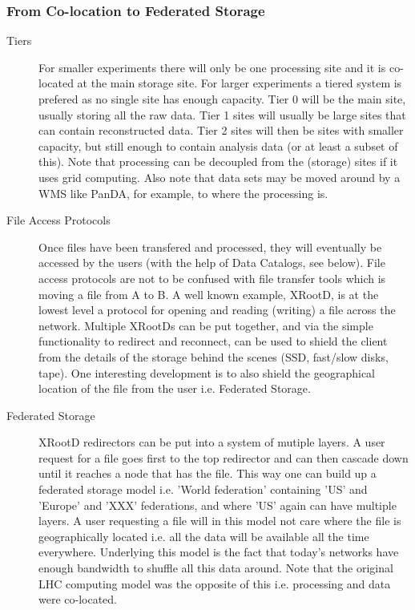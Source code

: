 \subsubsection{From Co-location to Federated Storage}

\begin{description}
\item[Tiers] For smaller experiments there will only be one processing site and it is co-located at the main storage site. For larger experiments 
a tiered system is prefered as no single site has enough capacity. Tier 0 will be the main site, usually storing all the raw data. Tier 1 sites will 
usually be large sites that can contain reconstructed data. Tier 2 sites will then be sites with smaller capacity, but still enough to contain 
analysis data (or at least a subset of this). Note that processing can be decoupled from the (storage) sites if it uses grid computing. Also note 
that data sets may be moved around by a WMS like PanDA, for example, to where the processing is.  

\item[File Access Protocols] Once files have been transfered and processed, they will eventually be accessed by the users (with the help of 
Data Catalogs, see below). File access protocols are not to be confused with file transfer tools which is moving a file from A to B. 
A well known example, XRootD, is at the lowest level a protocol for opening and reading (writing) a file across the network. Multiple XRootDs can 
be put together, and via the simple functionality to redirect and reconnect, can be used to shield the client from the details of the storage 
behind the scenes (SSD, fast/slow disks, tape). One interesting development is to also shield the geographical location of the file from the user i.e. 
Federated Storage.

\item[Federated Storage] XRootD redirectors can be put into a system of mutiple layers. A user request for a file goes first to the top 
redirector and can then cascade down until it reaches a node that has the file. This way one can build up a federated storage model i.e. 
'World federation' containing 'US' and 'Europe' and 'XXX' federations, and where 'US' again can have multiple layers. A user requesting a file 
will in this model not care where the file is geographically located i.e. all the data will be available all the time everywhere. Underlying this 
model is the fact that today's networks have enough bandwidth to shuffle all this data around. 
Note that the original LHC computing model was the opposite of this i.e. processing and data were co-located.
\end{description}


